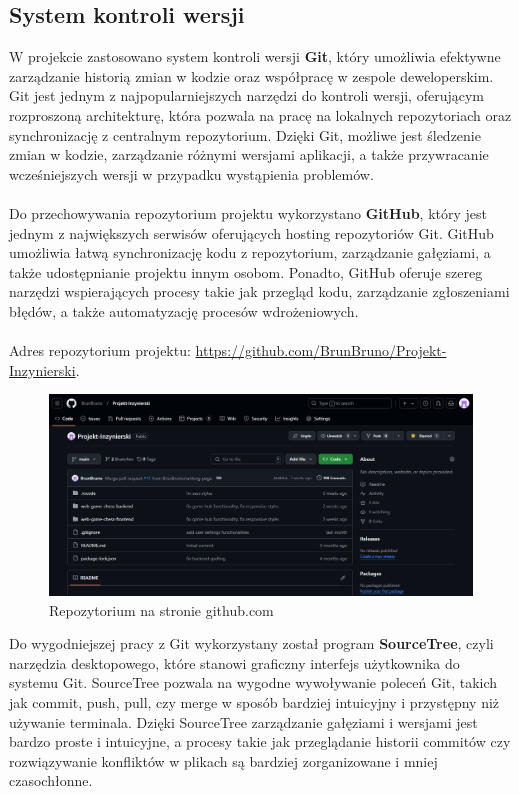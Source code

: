 \documentclass[12pt,a4paper]{article}
\begin{document}
\subsection{System kontroli wersji}

W projekcie zastosowano system kontroli wersji \textbf{Git}, który umożliwia efektywne zarządzanie historią zmian w kodzie oraz współpracę w zespole deweloperskim. Git jest jednym z najpopularniejszych narzędzi do kontroli wersji, oferującym rozproszoną architekturę, która pozwala na pracę na lokalnych repozytoriach oraz synchronizację z centralnym repozytorium. Dzięki Git, możliwe jest śledzenie zmian w kodzie, zarządzanie różnymi wersjami aplikacji, a także przywracanie wcześniejszych wersji w przypadku wystąpienia problemów.
\\\\
Do przechowywania repozytorium projektu wykorzystano  \textbf{GitHub}, który jest jednym z największych serwisów oferujących hosting repozytoriów Git. GitHub umożliwia łatwą synchronizację kodu z repozytorium, zarządzanie gałęziami, a także udostępnianie projektu innym osobom. Ponadto, GitHub oferuje szereg narzędzi wspierających procesy takie jak przegląd kodu, zarządzanie zgłoszeniami błędów, a także automatyzację procesów wdrożeniowych.
\\\\
Adres repozytorium projektu: \href{https://github.com/BrunBruno/Projekt-Inzynierski}{https://github.com/BrunBruno/Projekt-Inzynierski}.

\vspace{0.5cm}
\begin{figure}[h!]
    \centering
    \includegraphics[width=1\textwidth]{images/gh_repo.png}
    \caption{Repozytorium na stronie github.com}
\end{figure}
\vspace{0.5cm}

\noindent 
Do wygodniejszej pracy z Git wykorzystany został program  \textbf{SourceTree}, czyli narzędzia desktopowego, które stanowi graficzny interfejs użytkownika do systemu Git. SourceTree pozwala na wygodne wywoływanie poleceń Git, takich jak commit, push, pull, czy merge w sposób bardziej intuicyjny i przystępny niż używanie terminala. Dzięki SourceTree zarządzanie gałęziami i wersjami jest bardzo proste i intuicyjne, a procesy takie jak przeglądanie historii commitów czy rozwiązywanie konfliktów w plikach są bardziej zorganizowane i mniej czasochłonne.
\end{document}
